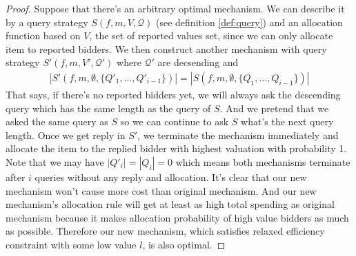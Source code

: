\begin{proof}
Suppose that there's an arbitrary optimal mechanism. We can describe it by a
query strategy $S(f, m, V, \mathcal Q)$ (see definition \ref{def:query}) and an
allocation function based on $V$, the set of reported values set, since we can
only allocate item to reported bidders. We then construct another mechanism
with query strategy $S'(f, m, V', \mathcal Q')$ where $\mathcal Q'$ are decsending
and 
\begin{align*}
|S'(f, m, \emptyset, \{Q'_1, \ldots, Q'_{i-1}\})| %
  = |S(f, m, \emptyset, \{Q_1, \ldots, Q_{i-1}\})|
\end{align*}
That says, if there's no reported bidders yet, we will always ask the
descending query which has the same length as the query of $S$. And we pretend
that we asked the same query as $S$ so we can continue to ask $S$ what's the
next query length. Once we get reply in $S'$, we terminate the mechanism
immediately and allocate the item to the replied bidder with highest valuation
with probability 1.  Note that we may have $|Q'_i| = |Q_i| = 0$ which means
both mechanisms terminate after $i$ queries without any reply and allocation.
It's clear that our new mechanism won't cause more cost than original
mechanism.  And our new mechanism's allocation rule will get at least as high
total spending as original mechanism because it makes allocation probability of
high value bidders as much as possible. Therefore our new mechanism, which
satisfies relaxed efficiency constraint with some low value $l$, is also
optimal.
%
%
\end{proof}

